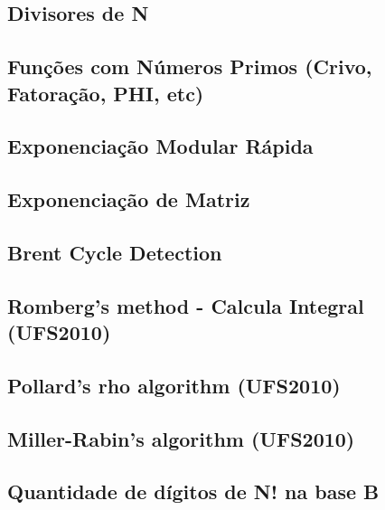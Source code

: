 \subsection{Divisores de N}
\raggedbottom
\hrulefill
\subsection{Funções com Números Primos (Crivo, Fatoração, PHI, etc)}
\raggedbottom
\hrulefill
\subsection{Exponenciação Modular Rápida}
\raggedbottom
\hrulefill
\subsection{Exponenciação de Matriz}
\raggedbottom
\hrulefill
\subsection{Brent	Cycle Detection}
\raggedbottom
\hrulefill
\subsection{Romberg's method - Calcula Integral (UFS2010)}
\raggedbottom
\hrulefill
\subsection{Pollard's rho algorithm (UFS2010)}
\raggedbottom
\hrulefill
\subsection{Miller-Rabin's algorithm (UFS2010)}
\raggedbottom
\hrulefill
\subsection{Quantidade de dígitos de N! na base B}
\raggedbottom
\hrulefill
